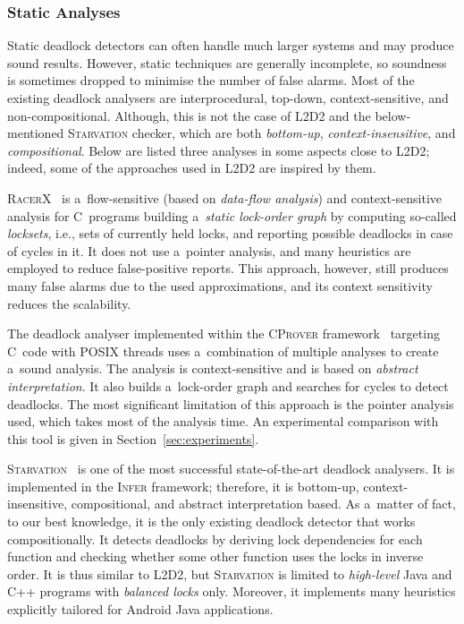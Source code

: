 \documentclass[runningheads]{llncs}
\begin{document}
\subsubsection{Static Analyses}

Static deadlock detectors can often handle much larger systems and may
produce sound results. However, static techniques are generally incomplete,
so soundness is sometimes dropped to minimise the number of false alarms.
Most of the existing deadlock analysers are interprocedural, top-down,
context-sensitive, and non-compositional. Although, this is not the case
of \textsc{L2D2} and the below-mentioned \textsc{Starvation} checker, which
are both \emph{bottom-up}, \emph{context-insensitive}, and
\emph{compositional}. Below are listed three analyses in some aspects close
to \textsc{L2D2}; indeed, some of the approaches used in \textsc{L2D2} are
inspired by them.

\textsc{RacerX}~\cite{racerX03} is a~flow-sensitive (based on
\emph{data-flow analysis}) and context-sensitive analysis for C~programs
building a~\emph{static lock-order graph} by computing so-called
\emph{locksets}, i.e., sets of currently held locks, and reporting
possible deadlocks in case of cycles in it. It does not use a~pointer
analysis, and many heuristics are employed to reduce false-positive
reports. This approach, however, still produces many false alarms due to
the used approximations, and its context sensitivity reduces the scalability.

The deadlock analyser implemented within the \textsc{CProver}
framework~\cite{kroening16} targeting C~code with POSIX threads uses
a~combination of multiple analyses to create a~sound analysis. The analysis
is context-sensitive and is based on \emph{abstract interpretation}. It also
builds a~lock-order graph and searches for cycles to detect deadlocks. The
most significant limitation of this approach is the pointer analysis used,
which takes most of the analysis time. An experimental comparison with this
tool is given in Section~\ref{sec:experiments}.

\textsc{Starvation}~\cite{deadlock-nikos21} is one of the most successful
state-of-the-art deadlock analysers. It is implemented in the
\textsc{Infer} framework; therefore, it is bottom-up, context-insensitive,
compositional, and abstract interpretation based. As a~matter of fact, to
our best knowledge, it is the only existing deadlock detector that works
compositionally. It detects deadlocks by deriving lock dependencies for each
function and checking whether some other function uses the locks in inverse
order. It is thus similar to \textsc{L2D2}, but \textsc{Starvation} is
limited to \emph{high-level} Java and C++ programs with \emph{balanced
locks} only. Moreover, it implements many heuristics explicitly tailored
for Android Java applications.
\end{document}
